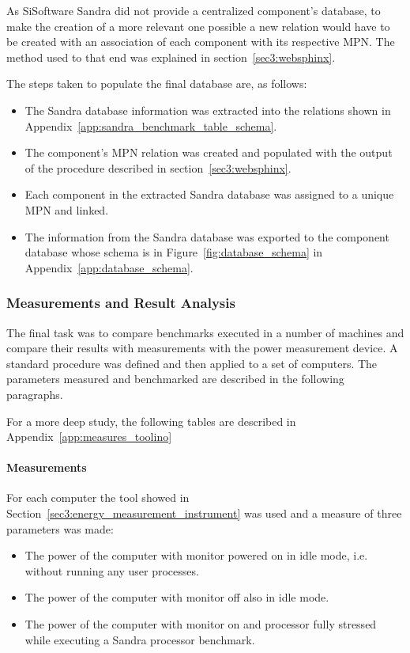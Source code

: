         As SiSoftware Sandra did not provide a centralized component's database, to make the creation of a more relevant one possible a new relation would have to be created with an association of each component with its respective MPN. The method used to that end was explained in section~\ref{sec3:websphinx}.
    
        The steps taken to populate the final database are, as follows:
        \begin{itemize}
            \item The Sandra database information was extracted into the relations shown in Appendix~\ref{app:sandra_benchmark_table_schema}.
            \item The component's MPN relation was created and populated with the output of the procedure described in section~\ref{sec3:websphinx}.
            \item Each component in the extracted Sandra database was assigned to a unique MPN and linked.
            \item The information from the Sandra database was exported to the component database whose schema is in Figure~\ref{fig:database_schema} in Appendix~\ref{app:database_schema}.
        \end{itemize}
    
    \subsubsection*{Measurements and Result Analysis}
        The final task was to compare benchmarks executed in a number of machines and compare their results with measurements with the power measurement device. A standard procedure was defined and then applied to a set of computers. The parameters measured and benchmarked are described in the following paragraphs.
        
        For a more deep study, the following tables are described in Appendix~\ref{app:measures_toolino}

        \paragraph*{Measurements}
            For each computer the tool showed in Section~\ref{sec3:energy_measurement_instrument} was used and a measure of three parameters was made:
            \begin{itemize}
                \item The power of the computer with monitor powered on in idle mode, i.e. without running any user processes.
                \item The power of the computer with monitor off also in idle mode.
                \item The power of the computer with monitor on and processor fully stressed while executing a Sandra processor benchmark.
            \end{itemize}
            
